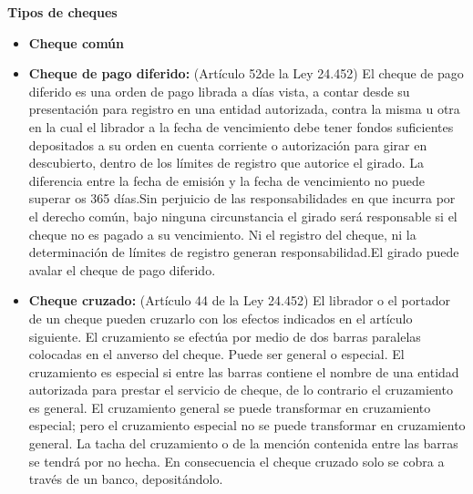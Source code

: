 \textbf{Tipos de cheques}
\begin{itemize}
 \item \textbf{Cheque com\'un}
 \item \textbf{Cheque de pago diferido:} (Art\'iculo 52de la Ley 24.452) El cheque de pago diferido es una orden de pago librada a días vista, a contar desde su presentación para registro en una entidad autorizada, contra la misma u otra en la cual el librador a la fecha de vencimiento debe tener fondos suficientes depositados a su orden en cuenta corriente o autorización para girar en descubierto, dentro de los límites de registro que autorice el girado. La diferencia entre la fecha de emisión y la fecha de vencimiento no puede superar os 365 días.Sin perjuicio de las responsabilidades en que incurra por el derecho común, bajo ninguna circunstancia el girado será responsable si el cheque no es pagado a su vencimiento. Ni el registro del cheque, ni la determinación de límites de registro generan responsabilidad.El girado puede avalar el cheque de pago diferido.
 \item \textbf{Cheque cruzado:} (Art\'iculo 44 de la Ley 24.452) El librador o el portador de un cheque pueden cruzarlo con los efectos indicados en el artículo siguiente. El cruzamiento se efectúa por medio de dos barras paralelas colocadas en el anverso del cheque. Puede ser general o especial. El cruzamiento es especial si entre las barras contiene el nombre de una entidad autorizada para prestar el servicio de cheque, de lo contrario el cruzamiento es general. El cruzamiento general se puede transformar en cruzamiento especial; pero el cruzamiento especial no se puede transformar en cruzamiento general. La tacha del cruzamiento o de la mención contenida entre las barras se tendrá por no hecha. En consecuencia el cheque cruzado solo se cobra a través de un banco, depositándolo.
\end{itemize}

